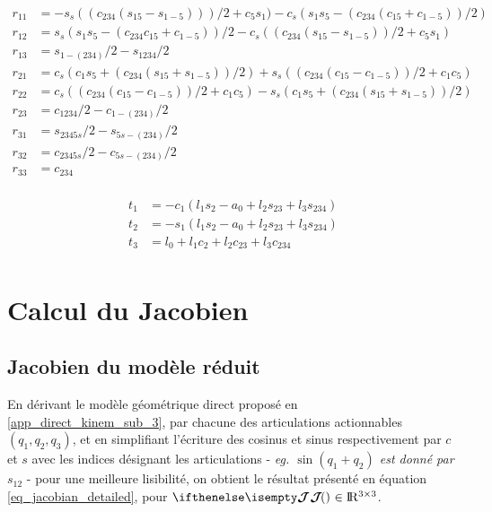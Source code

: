 \begin{appendices}
	\begin{equation} \label{eq_rotation_matrix}
		\begin{split}
			r_{11} &= -s_{s}((c_{234}(s_{15} - s_{1-5})))/2 + c_{5}s_{1}) - c_{s}(s_{1}s_{5} - (c_{234}(c_{15} + c_{1-5}))/2) \\
			r_{12} &= s_{s}(s_{1} s_5 - (c_{234} c_{15} + c_{1-5}))/2 - c_s ((c_{234} (s_{15} - s_{1-5}))/2 + c_5 s_1) \\	
			r_{13} &= s_{1-(234)}/2 - s_{1234}/2 \\
			r_{21} &= c_s (c_1 s_5 + (c_{234} (s_{15} + s_{1-5}))/2) + s_s ((c_{234} (c_{15} - c_{1-5}))/2 + c_{1} c_{5}) \\ 
			r_{22} &= c_s ((c_{234} (c_{15} - c_{1-5}))/2 + c_1 c_5) - s_s (c_1 s_5 + (c_{234} (s_{15} + s_{1-5}))/2) \\
			r_{23} &= c_{1234}/2 - c_{1-(234)}/2 \\
			r_{31} &= s_{2345s}/2 - s_{5s-(234)}/2 \\
			r_{32} &= c_{2345s}/2 - c_{5s-(234)}/2 \\
			r_{33} &= c_{234}\\
		\end{split}
	\end{equation}
	
	\begin{equation} \label{eq_translation_matrix}
		\begin{split}
		t_1 &= -c_1 (l_1 s_2 - a_0 + l_2 s_{23} + l_3 s_{234}) \\
		t_2 &= -s_1 (l_1 s_{2} - a_0 + l_2 s_{23} + l_3 s_{234}) \\
		t_3 &= l_0 + l_1 c_2 + l_2 c_{23} + l_3 c_{234} \\
		\end{split}
	\end{equation}
		
	\newpage
	\section{Calcul du Jacobien} \label{app_jacobian}
	
	\subsection{Jacobien du modèle réduit} \label{app_jacobian_sub_3}
	
	En dérivant le modèle géométrique direct proposé en \cref{app_direct_kinem_sub_3}, par chacune des articulations actionnables $ ( q_1, q_2, q_3 ) $, et en simplifiant l'écriture des cosinus et sinus respectivement par $ c $ et $ s $ avec les indices désignant les articulations - \textit{eg. $ \sin(q_1+q_2) $ est donné par $ s_{12} $} - pour une meilleure lisibilité, on obtient le résultat présenté en équation \cref{eq_jacobian_detailed}, pour $ \jacobian{}{}{} \in \R^{3 \times 3} $.
	

\end{appendices}
